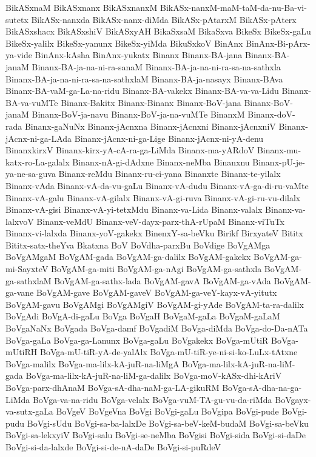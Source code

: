 {BikASxnaM
BikASxnanx
BikASxnanxM
BikASx-nanxM-maM-taM-da-nu-Ba-vi-sutetx
BikASx-nanxda
BikASx-nanx-diMda
BikASx-pAtarxM
BikASx-pAterx
BikASxshacx
BikASxshiV
BikASxyAH
BikaSxsaM
BikaSxva
BikeSx
BikeSx-gaLu
BikeSx-yalilx
BikeSx-yanunx
BikeSx-yiMda
BikuSxkoV
BinAnx
BinAnx-Bi-pArx-ya-vide
BinAnx-kAsha
BinAnx-yukatx
Binanx
Binanx-BA-jana
Binanx-BA-janaM
Binanx-BA-ja-na-ni-ra-sanaM
Binanx-BA-ja-na-ni-ra-sa-na-sathxla
Binanx-BA-ja-na-ni-ra-sa-na-sathxlaM
Binanx-BA-ja-nasayx
Binanx-BAva
Binanx-BA-vaM-ga-La-na-ridu
Binanx-BA-vakekx
Binanx-BA-va-va-Lidu
Binanx-BA-va-vuMTe
Binanx-Bakitx
Binanx-Binanx
Binanx-BoV-jana
Binanx-BoV-janaM
Binanx-BoV-ja-navu
Binanx-BoV-ja-na-vuMTe
BinanxM
Binanx-doV-rada
Binanx-gaNuNx
Binanx-jAcnxna
Binanx-jAcnxni
Binanx-jAcnxniV
Binanx-jAcnx-ni-ga-LAda
Binanx-jAcnx-ni-ga-Lige
Binanx-jAcnx-ni-yA-denu
BinanxkirxV
Binanx-kirx-yA-cA-ra-ga-LiMda
Binanx-ma-yARdoV
Binanx-mu-katx-ro-La-galalx
Binanx-nA-gi-dAdxne
Binanx-neMba
Binanxnu
Binanx-pU-je-ya-ne-sa-guva
Binanx-reMdu
Binanx-ru-ci-yana
Binanxte
Binanx-te-yilalx
Binanx-vAda
Binanx-vA-da-vu-gaLu
Binanx-vA-dudu
Binanx-vA-ga-di-ru-vaMte
Binanx-vA-galu
Binanx-vA-gilalx
Binanx-vA-gi-ruva
Binanx-vA-gi-ru-vu-dilalx
Binanx-vA-gisi
Binanx-vA-yi-tetxMdu
Binanx-va-Lida
Binanx-valalx
Binanx-va-lalxvoV
Binanx-veMdU
Binanx-veV-dayx-parx-thA-rUpaM
Binanx-viTuTx
Binanx-vi-lalxda
Binanx-yoV-gakekx
BinenxY-sa-beVku
Birikf
BirxyateV
Bititx
Bititx-satx-theYva
Bkatxna
BoV
BoVdha-parxBu
BoVdige
BoVgAMga
BoVgAMgaM
BoVgAM-gada
BoVgAM-ga-dalilx
BoVgAM-gakekx
BoVgAM-ga-mi-SayxteV
BoVgAM-ga-miti
BoVgAM-ga-nAgi
BoVgAM-ga-sathxla
BoVgAM-ga-sathxlaM
BoVgAM-ga-sathx-lada
BoVgAM-gavA
BoVgAM-ga-vAda
BoVgAM-ga-vane
BoVgAM-gave
BoVgAM-gaveV
BoVgAM-ga-veY-kayx-vA-yitutx
BoVgAM-gavu
BoVgAMgi
BoVgAMgiV
BoVgAM-gi-yAde
BoVgAM-ta-ra-dalilx
BoVgAdi
BoVgA-di-gaLu
BoVga
BoVgaH
BoVgaM-gaLa
BoVgaM-gaLaM
BoVgaNaNx
BoVgada
BoVga-damf
BoVgadiM
BoVga-diMda
BoVga-do-Da-nATa
BoVga-gaLa
BoVga-ga-Lanunx
BoVga-gaLu
BoVgakekx
BoVga-mUtiR
BoVga-mUtiRH
BoVga-mU-tiR-yA-de-yalAlx
BoVga-mU-tiR-ye-ni-si-ko-LuLx-tAtxne
BoVga-malilx
BoVga-ma-lilx-kA-juR-na-liMgA
BoVga-ma-lilx-kA-juR-na-liM-gada
BoVga-ma-lilx-kA-juR-na-liM-ga-dalilx
BoVga-moV-kASx-dhi-kAriV
BoVga-parx-dhAnaM
BoVga-sA-dha-naM-ga-LA-gikuRM
BoVga-sA-dha-na-ga-LiMda
BoVga-va-na-ridu
BoVga-velalx
BoVga-vuM-TA-gu-vu-da-riMda
BoVgayx-va-sutx-gaLa
BoVgeV
BoVgeVna
BoVgi
BoVgi-gaLu
BoVgipa
BoVgi-pude
BoVgi-pudu
BoVgi-sUdu
BoVgi-sa-ba-lalxDe
BoVgi-sa-beV-keM-budaM
BoVgi-sa-beVku
BoVgi-sa-lekxyiV
BoVgi-salu
BoVgi-se-neMba
BoVgisi
BoVgi-sida
BoVgi-si-daDe
BoVgi-si-da-lalxde
BoVgi-si-de-nA-daDe
BoVgi-si-puRdeV
}
